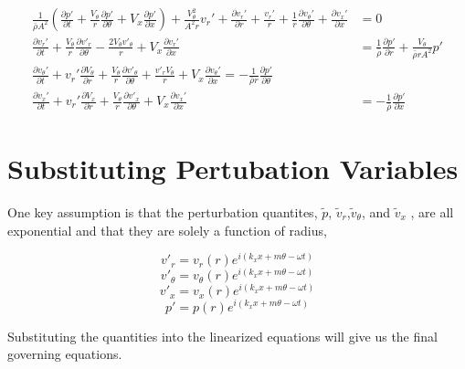 \begin{align*}
\frac{1}{\bar{\rho} A^2}\left(
\frac{\partial p'}{\partial t} +
\frac{V_{\theta}}{r}
\frac{\partial p'}{\partial \theta} + 
V_x
\frac{\partial p'}{\partial x}
\right) +
\frac{V_{\theta}^2}{A^2 r}v_r'+
\frac{\partial v_r'}{\partial r} + \frac{v_r'}{r} +
\frac{1}{r}
\frac{\partial v_{\theta}'}{\partial \theta}		 
 +
\frac{\partial v_x'}{\partial x}
&= 0\\
\frac{\partial  v_r' }{\partial t} +
\frac{V_{\theta}}{r} \frac{\partial v'_r}{\partial \theta} -
\frac{2V_{\theta}v'_{\theta}}{r} +
V_x \frac{\partial v_r'}{\partial x} &= \frac{1}{\bar{\rho}} \frac{\partial p'}{\partial r}+\frac{V_{\theta}}{\bar{\rho} r A^2}   p'
\\
\frac{\partial  v_{\theta}' }{\partial t} +
v_r' \frac{\partial  V_{\theta}  }{\partial r} +
\frac{V_{\theta}}{r} \frac{\partial v'_{\theta}}{\partial \theta} +
\frac{v'_rV_{\theta}}{r} +
V_x \frac{\partial v_{\theta}'}{\partial x} 
= -\frac{1}{\bar{\rho} r}	\frac{\partial p'}{\partial \theta}\\
\frac{\partial  v_x' }{\partial t} +
v_r' \frac{\partial  V_x  }{\partial r} +
\frac{V_{\theta}}{r} \frac{\partial v'_x}{\partial \theta} +
V_x \frac{\partial v_x'}{\partial x} 
&= -\frac{1    }{\bar{\rho}}  \frac{\partial p'}{\partial x} 	
\end{align*}

\section{Substituting Pertubation Variables}
One key assumption is that the perturbation quantites, $\tilde{p}$, 
$\tilde{v}_r$,$\tilde{v}_{\theta}$, and $\tilde{v}_x$ , are all exponential 
and that they are solely a function of radius, 

\[v'_r = v_r (r) e^{i\left(k_x x + m \theta - \omega t \right)} \]
\[v'_{\theta} = v_{\theta} (r) e^{i\left(k_x x + m \theta - \omega t \right)} \]	
\[v'_x = v_x (r) e^{i\left(k_x x + m \theta - \omega t\right)} \]	
\[p' = p(r) e^{i\left(k_x x + m \theta - \omega t\right)} \]	

\newpage

Substituting the quantities into the linearized equations will give us the final 
governing equations. 

